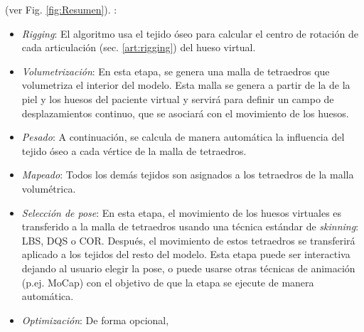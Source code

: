  (ver Fig. \ref{fig:Resumen}). :
\begin{itemize}

	\item \emph{Rigging}: %
	 El algoritmo usa el tejido óseo para calcular el centro de rotación de cada articulación (sec. \ref{art:rigging}) del hueso virtual.
	
     \item \emph{Volumetrización}: En esta etapa, se genera una malla de tetraedros que volumetriza el interior del modelo. Esta malla se genera a partir de la de la piel y los huesos del paciente virtual y servirá para definir un campo de desplazamientos continuo, que se asociará con el movimiento de los huesos.
\item \emph{Pesado}: A continuación, se calcula de manera automática la influencia del tejido óseo a cada vértice de la malla de tetraedros. 
\item \emph{Mapeado}: Todos los demás tejidos son asignados a los tetraedros de la malla volumétrica. 
\item \emph{Selección de pose}: En esta etapa, el movimiento de los huesos virtuales es transferido a la malla de tetraedros usando una técnica estándar de \emph{skinning}: \ac{LBS}, \ac{DQS} o \ac{COR}. 
Después, el movimiento de estos tetraedros se transferirá aplicado a los tejidos del resto del modelo. Esta etapa puede ser interactiva dejando al usuario elegir la pose, o puede usarse otras técnicas de animación (p.ej. \ac{MoCap}) con el objetivo de que la etapa se ejecute de manera automática.%
\item \emph{Optimización}: De forma opcional,

\end{itemize}

